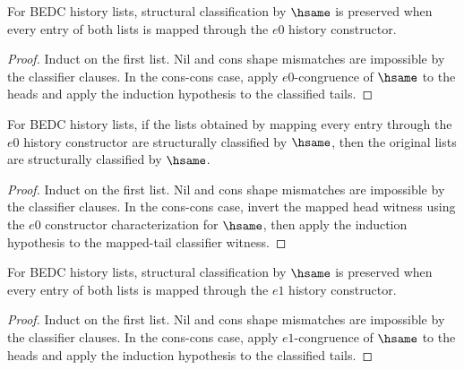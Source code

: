 \begin{theorem}
\label{thm:list-classifier-hsame-map-e0}
For BEDC history lists, structural classification by $\hsame$ is preserved when every entry of both lists is mapped through the $e0$ history constructor.
\end{theorem}
\begin{proof}
Induct on the first list. Nil and cons shape mismatches are impossible by the classifier clauses. In the cons-cons case, apply $e0$-congruence of $\hsame$ to the heads and apply the induction hypothesis to the classified tails.
\end{proof}

\begin{theorem}
\label{thm:list-classifier-hsame-map-e0-inversion}
For BEDC history lists, if the lists obtained by mapping every entry through
the $e0$ history constructor are structurally classified by $\hsame$, then the
original lists are structurally classified by $\hsame$.
\end{theorem}
\begin{proof}
Induct on the first list. Nil and cons shape mismatches are impossible by the
classifier clauses. In the cons-cons case, invert the mapped head witness using
the $e0$ constructor characterization for $\hsame$, then apply the induction
hypothesis to the mapped-tail classifier witness.
\end{proof}

\begin{theorem}
\label{thm:list-classifier-hsame-map-e1}
For BEDC history lists, structural classification by $\hsame$ is preserved when every entry of both lists is mapped through the $e1$ history constructor.
\end{theorem}
\begin{proof}
Induct on the first list. Nil and cons shape mismatches are impossible by the classifier clauses. In the cons-cons case, apply $e1$-congruence of $\hsame$ to the heads and apply the induction hypothesis to the classified tails.
\end{proof}

